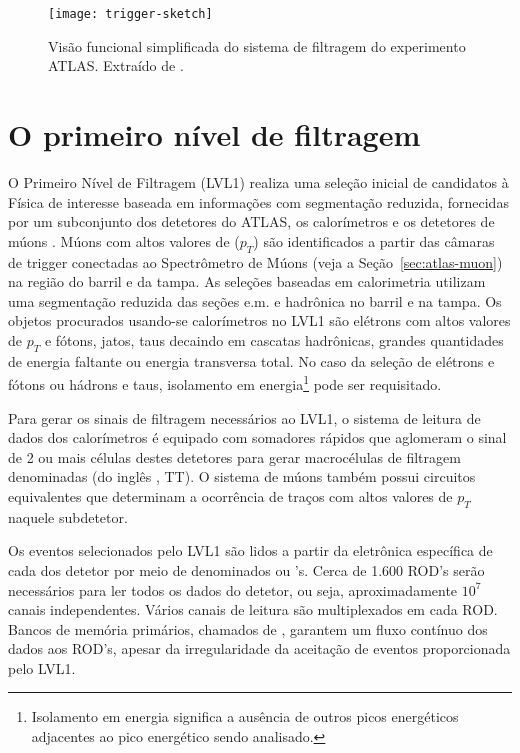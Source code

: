 \begin{figure}
\begin{center}
\texttt{[image: trigger-sketch]}
\end{center}
\caption[Visão funcional simplificada do sistema de filtragem do experimento
ATLAS.]{Visão funcional simplificada do sistema de filtragem do experimento
ATLAS. Extraído de \cite{hlt-tdr}.}
\label{fig:trigger-sketch}
\end{figure}

\section{O primeiro nível de filtragem}
\label{sec:lvl1}

O Primeiro Nível de Filtragem (LVL1) realiza uma seleção inicial de candidatos
à Física de interesse baseada em informações com segmentação reduzida,
fornecidas por um subconjunto dos detetores do ATLAS, os calorímetros e os
detetores de múons \cite{l1-tdr}. Múons com altos valores de  ($p_T$) são identificados a partir das câmaras de trigger
conectadas ao Spectrômetro de Múons (veja a Seção~\ref{sec:atlas-muon}) na
região do barril e da tampa. As seleções baseadas em calorimetria utilizam uma
segmentação reduzida das seções e.m. e hadrônica no barril e na tampa. Os
objetos procurados usando-se calorímetros no LVL1 são elétrons com altos
valores de $p_T$ e fótons, jatos, taus decaindo em cascatas hadrônicas,
grandes quantidades de energia faltante ou energia transversa total. No caso
da seleção de elétrons e fótons ou hádrons e taus, isolamento em
energia\footnote{Isolamento em energia significa a ausência de outros picos
energéticos adjacentes ao pico energético sendo analisado.} pode ser
requisitado.

Para gerar os sinais de filtragem necessários ao LVL1, o sistema de leitura de
dados dos calorímetros é equipado com somadores rápidos \cite{seixas:adder,
lar-tdr} que aglomeram o sinal de 2 ou mais células destes detetores para
gerar macrocélulas de filtragem denominadas  (do
inglês , TT). O sistema de múons também possui
circuitos equivalentes que determinam a ocorrência de traços com altos valores
de $p_T$ naquele subdetetor.

Os eventos selecionados pelo LVL1 são lidos a partir da eletrônica específica
de cada dos detetor por meio de  denominados  ou 's. Cerca de 1.600 ROD's serão necessários para ler todos
os dados do detetor, ou seja, aproximadamente $10^7$ canais
independentes. Vários canais de leitura são multiplexados em cada ROD. Bancos
de memória primários, chamados de , garantem um fluxo
contínuo dos dados aos ROD's, apesar da irregularidade da aceitação de eventos
proporcionada pelo LVL1.

